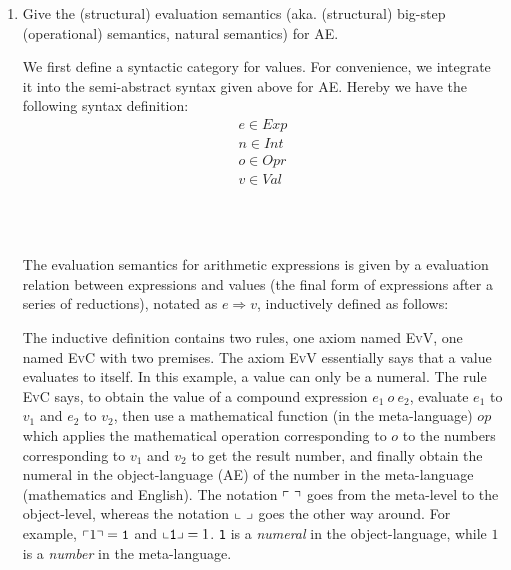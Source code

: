 \documentclass[a4paper,12pt]{article}
\newcommand{\term}[1]{\textsf{#1}}
\newcommand{\appl}[2]{#1\inparens{#2}}
\newcommand{\eval}[2]{#1 \Longrightarrow #2}
\begin{document}
\begin{enumerate}
 \item Give the \term{(structural) evaluation semantics} (aka. \term{(structural)
  big-step (operational) semantics}, \term{natural semantics}) for AE.

  We first define a syntactic category for values.  For convenience, we integrate
  it into the semi-abstract syntax given above for AE.  Hereby we have the following
  syntax definition:
  \begin{gather*}
   e \in Exp \\
   n \in Int \\
   o \in Opr \\
   v \in Val
  \end{gather*}

  \begin{grammar}
   \\
   \\
  \end{grammar}
  
  The evaluation semantics for arithmetic expressions is given by a evaluation relation
  between expressions and values (the final form of expressions after a series of
  reductions), notated as $\eval{e}{v}$, inductively defined as follows:
  The inductive definition contains two rules, one axiom named \textsc{EvV}, one named
  \textsc{EvC} with two premises. The axiom \textsc{EvV} essentially says that a value
  evaluates to itself. In this example, a value can only be a numeral. The rule
  \textsc{EvC} says, to obtain the value of a compound expression $e_1\ o\ e_2$, evaluate
  $e_1$ to $v_1$ and $e_2$ to $v_2$, then use a mathematical function (in the meta-language)
  $op$ which applies the mathematical operation corresponding to $o$ to the numbers
  corresponding to $v_1$ and $v_2$ to get the result number, and finally obtain the numeral
  in the object-language (AE) of the number in the meta-language (mathematics and English).
  The notation $\inucorners{\ }$ goes from the meta-level to the object-level, whereas the
  notation $\left\llcorner\ \right\lrcorner$ goes the other way around.  For example, $\left\ulcorner1\right\urcorner =
  \texttt{1}$ and $\left\llcorner\texttt{1}\right\lrcorner = 1$.  \verb|1| is a \emph{numeral} in the
  object-language, while $1$ is a \emph{number} in the meta-language.


\end{enumerate}
\end{document}

